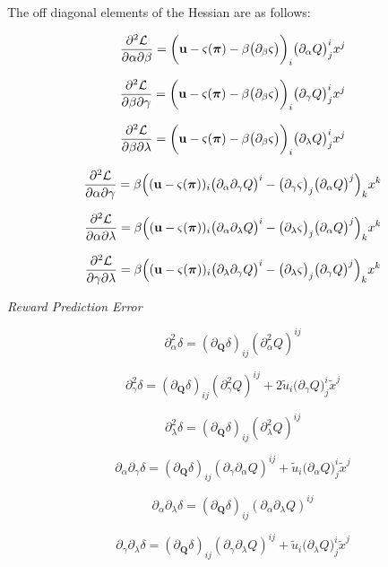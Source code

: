 The off diagonal elements of the Hessian are as follows:

\[
\frac{\partial^2 \mathcal L}{\partial \alpha \partial \beta}   = \bigg(\mathbf u - \varsigma(\boldsymbol\pi) - \beta \big(\partial_\beta \varsigma \big) \bigg)_i \big( \partial_\alpha Q \big)^i_j x^j
\]

\[
\frac{\partial^2 \mathcal L}{\partial \beta \partial \gamma}   =  \bigg(\mathbf u - \varsigma(\boldsymbol\pi) - \beta \big(\partial_\beta \varsigma \big) \bigg)_i \big( \partial_\gamma Q \big)^i_j x^j
\]

\[
\frac{\partial^2 \mathcal L}{\partial \beta \partial \lambda}  =  \bigg(\mathbf u - \varsigma(\boldsymbol\pi) - \beta \big(\partial_\beta \varsigma \big) \bigg)_i \big( \partial_\lambda Q \big)^i_j x^j
\]

\[
\frac{\partial^2 \mathcal L}{\partial \alpha \partial \gamma}  = \beta \Big((\mathbf u - \varsigma(\boldsymbol\pi))_i \big(\partial_\alpha \partial_\gamma Q \big)^i - \big( \partial_\gamma \varsigma \big)_j \big( \partial_\alpha Q \big)^j \Big)_k x^k
\]

\[
\frac{\partial^2 \mathcal L}{\partial \alpha \partial \lambda} =  \beta \Big((\mathbf u - \varsigma(\boldsymbol\pi))_i \big(\partial_\alpha \partial_\lambda Q \big)^i - \big( \partial_\lambda \varsigma \big)_j \big( \partial_\alpha Q \big)^j \Big)_k x^k
\]

\[
\frac{\partial^2 \mathcal L}{\partial \gamma \partial \lambda} =  \beta \Big((\mathbf u - \varsigma(\boldsymbol\pi))_i \big(\partial_\lambda \partial_\gamma Q \big)^i - \big( \partial_\lambda \varsigma \big)_j \big( \partial_\gamma Q \big)^j \Big)_k x^k
\]

\emph{Reward Prediction Error}

\[
\partial^2_\alpha \delta = (\partial_{\mathbf Q} \delta)_{ij} (\partial^2_\alpha Q)^{ij}
\]

\[
\partial^2_\gamma \delta = (\partial_{\mathbf Q} \delta)_{ij} (\partial^2_\gamma Q)^{ij} + 2 \tilde{u}_i \big(\partial_\gamma Q\big)^i_j \tilde{x}^j
\]

\[
\partial^2_\lambda \delta = (\partial_{\mathbf Q} \delta)_{ij} (\partial^2_\lambda Q)^{ij}
\]

\[
\partial_\alpha \partial_\gamma \delta = (\partial_{\mathbf Q} \delta)_{ij} (\partial_\gamma \partial_\alpha Q)^{ij} + \tilde{u}_i \big(\partial_\alpha Q\big)^i_j \tilde{x}^j
\]

\[
\partial_\alpha \partial_\lambda \delta = (\partial_{\mathbf Q} \delta)_{ij} (\partial_\alpha \partial_\lambda Q)^{ij}
\]

\[
\partial_\gamma \partial_\lambda \delta = (\partial_{\mathbf Q} \delta)_{ij} (\partial_\gamma \partial_\lambda Q)^{ij} + \tilde{u}_i \big(\partial_\lambda Q\big)^i_j \tilde{x}^j
\]

